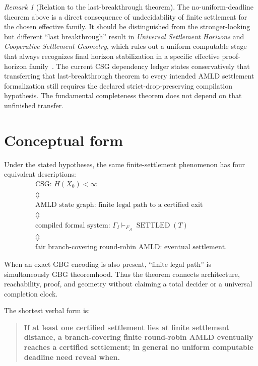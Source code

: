 \documentclass[11pt]{article}
\theoremstyle{remark}
\newtheorem{remark}[definition]{Remark}
\newcommand{\Sett}{\operatorname{SETTLED}}
\begin{document}
\begin{remark}[Relation to the last-breakthrough theorem]
The no-uniform-deadline theorem above is a direct consequence of undecidability of finite settlement for the chosen effective family.  It should be distinguished from the stronger-looking but different ``last breakthrough'' result in \emph{Universal Settlement Horizons} and \emph{Cooperative Settlement Geometry}, which rules out a uniform computable stage that always recognizes final horizon stabilization in a specific effective proof-horizon family~\cite{USH,CSG}.  The current CSG dependency ledger states conservatively that transferring that last-breakthrough theorem to every intended AMLD settlement formalization still requires the declared strict-drop-preserving compilation hypothesis.  The fundamental completeness theorem does not depend on that unfinished transfer.
\end{remark}

\section{Conceptual form}

Under the stated hypotheses, the same finite-settlement phenomenon has four equivalent descriptions:
\[
\boxed{
\begin{array}{c}
\text{CSG: }H(X_0)<\infty\\[1mm]
\Updownarrow\\[-1mm]
\text{AMLD state graph: finite legal path to a certified exit}\\[1mm]
\Updownarrow\\[-1mm]
\text{compiled formal system: }\Gamma_I\vdash_{F_{\mathcal A}}\Sett(T)\\[1mm]
\Updownarrow\\[-1mm]
\text{fair branch-covering round-robin AMLD: eventual settlement.}
\end{array}}
\]

When an exact GBG encoding is also present, ``finite legal path'' is simultaneously GBG theoremhood.  Thus the theorem connects architecture, reachability, proof, and geometry without claiming a total decider or a universal completion clock.

The shortest verbal form is:
\begin{quote}
\textbf{If at least one certified settlement lies at finite settlement distance, a branch-covering finite round-robin AMLD eventually reaches a certified settlement; in general no uniform computable deadline need reveal when.}
\end{quote}
\end{document}
